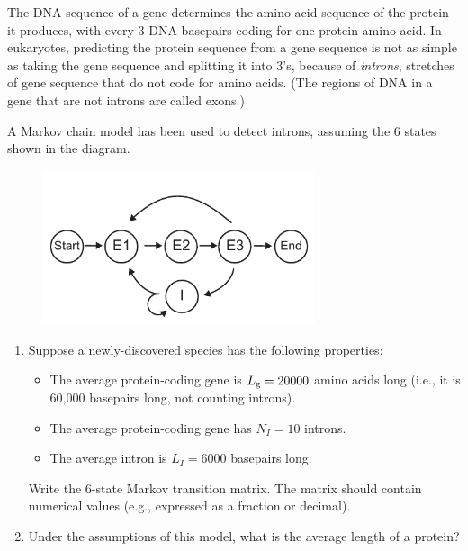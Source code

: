 \documentclass[12pt,letterpaper]{article}
\begin{document}


The DNA sequence of a gene determines the amino acid sequence of the protein it produces, with every 3 DNA basepairs coding for one protein amino acid. In eukaryotes, predicting the protein sequence from a gene sequence is not as simple as taking the gene sequence and splitting it into 3's, because of \emph{introns}, stretches of gene sequence that do not code for amino acids. (The regions of DNA in a gene that are not introns are called exons.)

A Markov chain model has been used to detect introns, assuming the 6 states shown in the diagram.
\begin{figure}[h!]
\centering\includegraphics[width=8cm]{figP21}
\end{figure}

\begin{enumerate}[i]
\item Suppose a newly-discovered species has the following properties:
\begin{itemize}
\item The average protein-coding gene is $L_{\rm g} = 20000$ amino acids long (i.e., it is 60,000 basepairs long, not counting introns).
\item The average protein-coding gene has $N_I=10$ introns.
\item The average intron is $L_I=6000$ basepairs long. 
\end{itemize}
Write the 6-state Markov transition matrix. The matrix should contain numerical values (e.g., expressed as a fraction or decimal). 
\item Under the assumptions of this model, what is the average length of a protein?
\end{enumerate}

\end{document}
